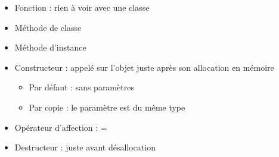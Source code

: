 \begin{itemize}
	\item Fonction : rien à voir avec une classe
	\item Méthode de classe
	\item Méthode d'instance
\end{itemize}

\begin{itemize}
	\item Constructeur : appelé sur l'objet juste après son allocation en mémoire
	\begin{itemize}
		\item Par défaut : sans paramètres
		\item Par copie : le paramètre est du même type
	\end{itemize}
	\item Opérateur d'affection : =
	\item Destructeur : juste avant désallocation
\end{itemize}
